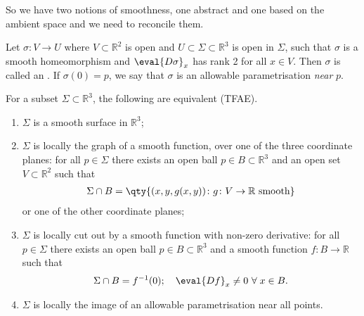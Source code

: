 So we have two notions of smoothness, one abstract and one based on the ambient space and we need to reconcile them.

\begin{definition}
	Let $\sigma \colon V \to U$ where $V \subset \mathbb R^2$ is open and $U \subset \Sigma \subset \mathbb R^3$ is open in $\Sigma$, such that $\sigma$ is a smooth homeomorphism and $\eval{D\sigma}_x$ has rank 2 for all $x \in V$.
	Then $\sigma$ is called an .
	If $\sigma(0) = p$, we say that $\sigma$ is an allowable parametrisation \textit{near} $p$.
\end{definition}

\begin{theorem} \label{thm:1.7}
	For a subset $\Sigma \subset \mathbb R^3$, the following are equivalent (TFAE).
	\begin{enumerate}
		\item $\Sigma$ is a smooth surface in $\mathbb R^3$;
		\item $\Sigma$ is locally the graph of a smooth function, over one of the three coordinate planes: for all $p \in \Sigma$ there exists an open ball $p \in B \subset \mathbb R^3$ and an open set $V \subset \mathbb R^2$ such that
		      \begin{align*}
			      \Sigma \cap B = \qty{(x, y, g(x,y)) \colon g \colon V \to \mathbb R \text{ smooth}}
		      \end{align*}
		      or one of the other coordinate planes;
		\item $\Sigma$ is locally cut out by a smooth function with non-zero derivative: for all $p \in \Sigma$ there exists an open ball $p \in B \subset \mathbb R^3$ and a smooth function $f \colon B \to \mathbb R$ such that
		      \begin{align*}
			      \Sigma \cap B = f^{-1}(0);\quad \eval{Df}_x \neq 0 \ \forall \; x \in B.
		      \end{align*}
		\item $\Sigma$ is locally the image of an allowable parametrisation near all points.
	\end{enumerate}
\end{theorem}

